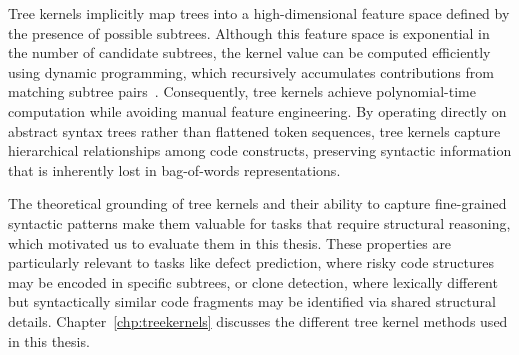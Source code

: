 \documentclass[\main/thesis.tex]{subfiles}
\begin{document}

Tree kernels implicitly map trees into a high-dimensional feature space defined by the presence of possible subtrees. Although this feature space is exponential in the number of candidate subtrees, the kernel value can be computed efficiently using dynamic programming, which recursively accumulates contributions from matching subtree pairs~\cite{treekernels2001}. Consequently, tree kernels achieve polynomial-time computation while avoiding manual feature engineering. By operating directly on abstract syntax trees rather than flattened token sequences, tree kernels capture hierarchical relationships among code constructs, preserving syntactic information that is inherently lost in bag-of-words representations.

The theoretical grounding of tree kernels and their ability to capture fine-grained syntactic patterns make them valuable for tasks that require structural reasoning, which motivated us to evaluate them in this thesis. These properties are particularly relevant to tasks like defect prediction, where risky code structures may be encoded in specific subtrees, or clone detection, where lexically different but syntactically similar code fragments may be identified via shared structural details. Chapter~\ref{chp:treekernels} discusses the different tree kernel methods used in this thesis.
\end{document}

